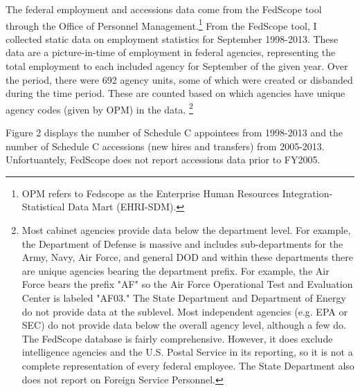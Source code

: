 \documentclass[12pt]{article}
\begin{document}
The federal employment and accessions data come from the FedScope tool through the Office of Personnel Management.\footnote{OPM refers to Fedscope as the Enterprise Human Resources Integration-Statistical Data Mart (EHRI-SDM).} From the FedScope tool, I collected static data on employment statistics for September 1998-2013. These data are a picture-in-time of employment in federal agencies, representing the total employment to each included agency for September of the given year. Over the period, there were 692 agency units, some of which were created or disbanded during the time period. These are counted based on which agencies have unique agency codes (given by OPM) in the data. \footnote{Most cabinet agencies provide data below the department level. For example, the Department of Defense is massive and includes sub-departments for the Army, Navy, Air Force, and general DOD and within these departments there are unique agencies bearing the department prefix. For example, the Air Force bears the prefix "AF" so the Air Force Operational Test and Evaluation Center is labeled "AF03." The State Department and Department of Energy do not provide data at the sublevel. Most independent agencies (e.g. EPA or SEC) do not provide data below the overall agency level, although a few do. The FedScope database is fairly comprehensive. However, it does exclude intelligence agencies and the U.S. Postal Service in its reporting, so it is not a complete representation of every federal employee. The State Department also does not report on Foreign Service Personnel.}

Figure 2 displays the number of Schedule C appointees from 1998-2013 and the number of Schedule C accessions (new hires and transfers) from 2005-2013. Unfortuantely, FedScope does not report accessions data prior to FY2005. 
\end{document}
